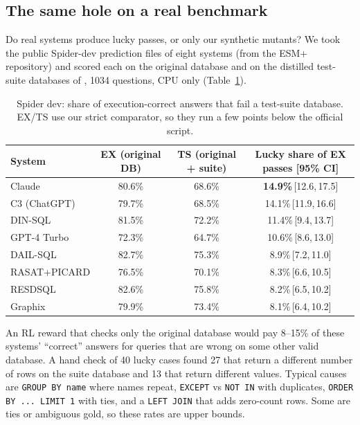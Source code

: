 \documentclass{article}
\newcommand{\code}[1]{\texttt{#1}}
\newcommand{\ci}[2]{\,[#1,\,#2]}
\begin{document}
\subsection{The same hole on a real benchmark}
\label{sec:spider}

Do real systems produce lucky passes, or only our synthetic mutants? We took the public Spider-dev \citep{yu2018spider} prediction files of eight systems (from the ESM+ repository) and scored each on the original database and on the distilled test-suite databases of \citet{zhong2020semantic}, 1034 questions, CPU only (Table~\ref{tab:spider}).

\begin{table}[t]
\caption{Spider dev: share of execution-correct answers that fail a test-suite database. EX/TS use our strict comparator, so they run a few points below the official script.}
\label{tab:spider}
\centering\small
\begin{tabular}{lccc}
\toprule
System & EX (original DB) & TS (original + suite) & Lucky share of EX passes [95\% CI]\\
\midrule
Claude & 80.6\% & 68.6\% & \textbf{14.9\%}\ci{12.6}{17.5}\\
C3 (ChatGPT) & 79.7\% & 68.5\% & 14.1\%\ci{11.9}{16.6}\\
DIN-SQL & 81.5\% & 72.2\% & 11.4\%\ci{9.4}{13.7}\\
GPT-4 Turbo & 72.3\% & 64.7\% & 10.6\%\ci{8.6}{13.0}\\
DAIL-SQL & 82.7\% & 75.3\% & 8.9\%\ci{7.2}{11.0}\\
RASAT+PICARD & 76.5\% & 70.1\% & 8.3\%\ci{6.6}{10.5}\\
RESDSQL & 82.6\% & 75.8\% & 8.2\%\ci{6.5}{10.2}\\
Graphix & 79.9\% & 73.4\% & 8.1\%\ci{6.4}{10.2}\\
\bottomrule
\end{tabular}
\end{table}

An RL reward that checks only the original database would pay 8--15\% of these systems' ``correct'' answers for queries that are wrong on some other valid database. A hand check of 40 lucky cases found 27 that return a different number of rows on the suite database and 13 that return different values. Typical causes are \code{GROUP BY name} where names repeat, \code{EXCEPT} vs \code{NOT IN} with duplicates, \code{ORDER BY ... LIMIT 1} with ties, and a \code{LEFT JOIN} that adds zero-count rows. Some are ties or ambiguous gold, so these rates are upper bounds.
\end{document}
